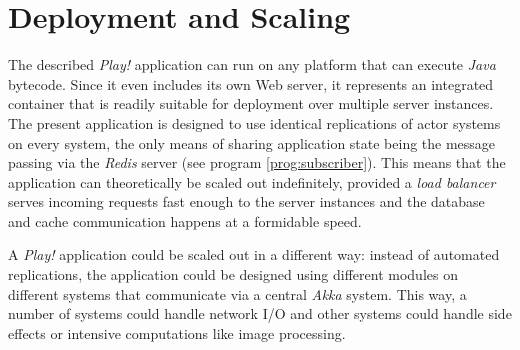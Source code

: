 \section{Deployment and Scaling}
The described \textit{Play!} application can run on any platform that can execute \textit{Java} bytecode. Since it even includes its own Web server, it represents an integrated container that is readily suitable for deployment over multiple server instances. The present application is designed to use identical replications of actor systems on every system, the only means of sharing application state being the message passing via the \textit{Redis} server (see program \ref{prog:subscriber}). This means that the application can theoretically be scaled out indefinitely, provided a \textit{load balancer} serves incoming requests fast enough to the server instances and the database and cache communication happens at a formidable speed.

A \textit{Play!} application could be scaled out in a different way: instead of automated replications, the application could be designed using different modules on different systems that communicate via a central \textit{Akka} system. This way, a number of systems could handle network I/O and other systems could handle side effects or intensive computations like image processing.
